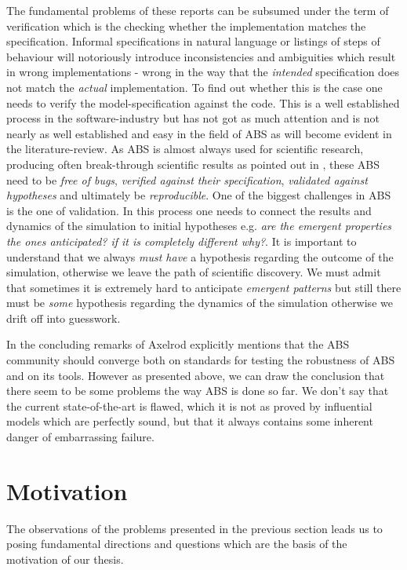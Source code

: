 The fundamental problems of these reports can be subsumed under the term of verification which is the checking whether the implementation matches the specification. Informal specifications in natural language or listings of steps of behaviour will notoriously introduce inconsistencies and ambiguities which result in wrong implementations - wrong in the way that the \textit{intended} specification does not match the \textit{actual} implementation. To find out whether this is the case one needs to verify the model-specification against the code. This is a well established process in the software-industry but has not got as much attention and is not nearly as well established and easy in the field of ABS as will become evident in the literature-review.
As ABS is almost always used for scientific research, producing often break-through scientific results as pointed out in \cite{axelrod_chapter_2006}, these ABS need to be \textit{free of bugs}, \textit{verified against their specification}, \textit{validated against hypotheses} and ultimately be \textit{reproducible}. One of the biggest challenges in ABS is the one of validation. In this process one needs to connect the results and dynamics of the simulation to initial hypotheses e.g. \textit{are the emergent properties the ones anticipated? if it is completely different why?}. It is important to understand that we always \textit{must have} a hypothesis regarding the outcome of the simulation, otherwise we leave the path of scientific discovery. We must admit that sometimes it is extremely hard to anticipate \textit{emergent patterns} but still there must be \textit{some} hypothesis regarding the dynamics of the simulation otherwise we drift off into guesswork.

In the concluding remarks of \cite{axelrod_chapter_2006} Axelrod explicitly mentions that the ABS community should converge both on standards for testing the robustness of ABS and on its tools. However as presented above, we can draw the conclusion that there seem to be some problems the way ABS is done so far. We don't say that the current state-of-the-art is flawed, which it is not as proved by influential models which are perfectly sound, but that it always contains some inherent danger of embarrassing failure.

\section{Motivation}
The observations of the problems presented in the previous section leads us to posing fundamental directions and questions which are the basis of the motivation of our thesis.

